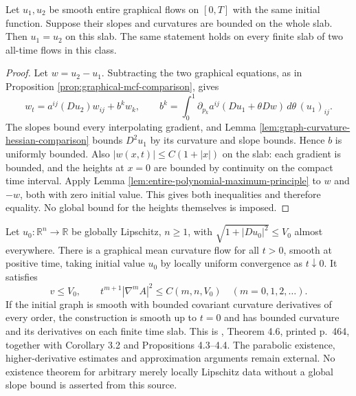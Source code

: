 \begin{proposition}\label{prop:entire-graph-bounded-geometry-uniqueness}
Let $u_1,u_2$ be smooth entire graphical flows on $[0,T]$ with the same initial function. Suppose their slopes and curvatures are bounded on the whole slab. Then $u_1=u_2$ on this slab. The same statement holds on every finite slab of two all-time flows in this class.
\end{proposition}
\begin{proof}
Let $w=u_2-u_1$. Subtracting the two graphical equations, as in Proposition \ref{prop:graphical-mcf-comparison}, gives
\[
 w_t=a^{ij}(Du_2)w_{ij}+b^kw_k,\qquad
 b^k=\int_0^1\partial_{p_k}a^{ij}(Du_1+\theta Dw)\,d\theta\,(u_1)_{ij}.
\]
The slopes bound every interpolating gradient, and Lemma \ref{lem:graph-curvature-hessian-comparison} bounds $D^2u_1$ by its curvature and slope bounds. Hence $b$ is uniformly bounded. Also $|w(x,t)|\leq C(1+|x|)$ on the slab: each gradient is bounded, and the heights at $x=0$ are bounded by continuity on the compact time interval. Apply Lemma \ref{lem:entire-polynomial-maximum-principle} to $w$ and $-w$, both with zero initial value. This gives both inequalities and therefore equality. No global bound for the heights themselves is imposed.
\end{proof}

\begin{theorem}\label{thm:ecker-huisken-global-graph-existence}
Let $u_0:\mathbb R^n\to\mathbb R$ be globally Lipschitz, $n\geq1$, with $\sqrt{1+|Du_0|^2}\leq V_0$ almost everywhere. There is a graphical mean curvature flow for all $t>0$, smooth at positive time, taking initial value $u_0$ by locally uniform convergence as $t\downarrow0$. It satisfies
\[
 v\leq V_0,\qquad t^{m+1}|\nabla^m A|^2\leq C(m,n,V_0)
 \quad(m=0,1,2,\ldots).
\]
If the initial graph is smooth with bounded covariant curvature derivatives of every order, the construction is smooth up to $t=0$ and has bounded curvature and its derivatives on each finite time slab. This is \cite{EH89}, Theorem 4.6, printed p.~464, together with Corollary 3.2 and Propositions 4.3--4.4. The parabolic existence, higher-derivative estimates and approximation arguments remain external. No existence theorem for arbitrary merely locally Lipschitz data without a global slope bound is asserted from this source.
\end{theorem}

